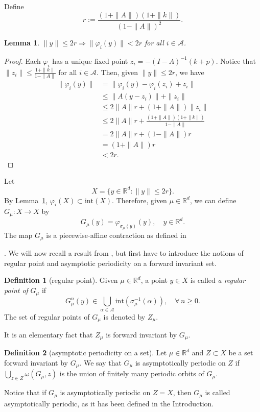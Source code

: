 \documentclass[12pt,reqno,a4paper]{amsart}%
\newtheorem{lemma}{Lemma}
\theoremstyle{definition}
\newtheorem{defn}{Definition}
\theoremstyle{remark}
\newcommand{\Rr}{\mathbb{R}}
\begin{document}
{{Define
$$
r:=\frac{(1+\|A\|)(1+\|k\|)}{(1-\|A\|)^2}.
$$
\begin{lemma}\label{lem:invariantball} $\|y\|\leq 2r \Longrightarrow \|\varphi_{{i}}(y)\|< 2r$ {for all $i\in\mathcal{A}$}.
\end{lemma}
\begin{proof}
Each $\varphi_{{i}}$ has a unique fixed point $z_{{i}} = -(I-A)^{-1}(k+p)$. Notice that $\|z_{{i}}\|\leq \frac{1+\|k\|}{1-\|A\|}$ for all ${i}\in\mathcal{A}$. Then, given $\|y\|\leq {2r}$, we have
\begin{align*}
\|\varphi_{{i}}(y)\| &= \|\varphi_{{i}}(y)- \varphi_{{i}}(z_{{i}}) + z_{{i}}\|\\
&\leq\|A(y-z_{{i}})\| + \|z_{{i}}\|\\
&\leq 2\|A\| r + (1+\|A\|)\|z_{{i}}\|\\
&\leq 2\|A\| r + \frac{(1+\|A\|)(1+\|k\|)}{1-\|A\|}\\
&= 2\|A\| r + (1-\|A\|)r\\
&= (1+\|A\|)r\\
&< 2r.
\end{align*}
\end{proof}
Let 
$$
X=\{y\in\Rr^d\colon \|y\|\leq 2 r\}.
$$
By Lemma~\ref{lem:invariantball}, $\varphi_{{i}}(X)\subset \mathrm{int}(X)$. Therefore, 
given $\mu\in\Rr^d$, we can define $G_\mu\colon X\to X$ by 
$$
G_\mu(y)=\varphi_{\sigma_\mu(y)}(y),\quad y\in \Rr^d.
$$
The map $G_\mu$ is a piecewise-affine contraction as defined in \cite[Equation (2.9)]{GaivaoPires2024}}. We will now recall a result from \cite{GaivaoPires2024}, but first have to introduce the {notions} of regular point {and asymptotic periodicity on a forward invariant set}. 
\begin{defn}[{regular point}]\label{def:regular} {Given $\mu\in\mathbb{R}^d$,}
a point $y\in X$ is called \textit{a regular point of} $G_\mu$ if 
$$
G_\mu^n(y) \in \bigcup_{\alpha\in\mathcal{A}}\mathrm{int}(\sigma_\mu^{-1}(\alpha)),\quad \forall\,n\geq0.
$$
The set of regular points of $G_\mu$ is denoted by $Z_\mu$.
\end{defn}
{It is an elementary  fact that $Z_\mu$ is forward invariant by $G_\mu$.}
{
\begin{defn}[asymptotic periodicity on a set] Let $\mu\in\mathbb{R}^d$ and
 $Z\subset X$ be a set forward invariant by $G_\mu$. We say that $G_\mu$ is asymptotically periodic on $Z$ if $\bigcup_{z\in Z} \omega(G_\mu,z)$ is the union of finitely many periodic orbits of $G_\mu$. 
\end{defn}
}
{
Notice that if $G_{\mu}$ is asymptotically periodic on $Z=X$, then $G_{\mu}$ is called asymptotically periodic, as it has been defined in the Introduction.}

}
\end{document}
